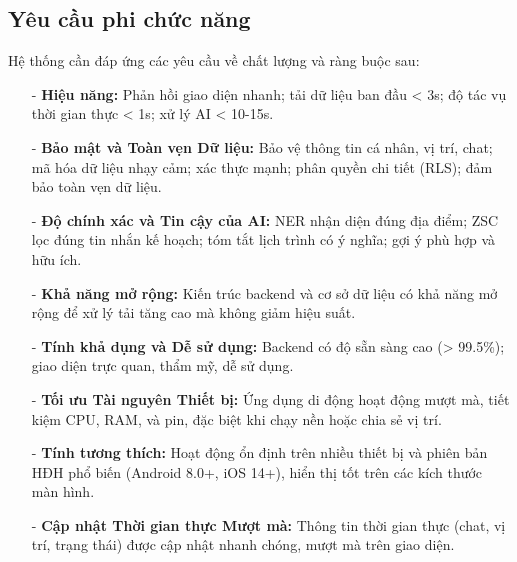 \subsection{Yêu cầu phi chức năng}

Hệ thống cần đáp ứng các yêu cầu về chất lượng và ràng buộc sau:

\begin{itemize}
    \item[-] \textbf{Hiệu năng:} Phản hồi giao diện nhanh; tải dữ liệu ban đầu < 3s; độ tác vụ thời gian thực < 1s; xử lý AI < 10-15s.
    \item[-] \textbf{Bảo mật và Toàn vẹn Dữ liệu:} Bảo vệ thông tin cá nhân, vị trí, chat; mã hóa dữ liệu nhạy cảm; xác thực mạnh; phân quyền chi tiết (RLS); đảm bảo toàn vẹn dữ liệu.
    \item[-] \textbf{Độ chính xác và Tin cậy của AI:} NER nhận diện đúng địa điểm; ZSC lọc đúng tin nhắn kế hoạch; tóm tắt lịch trình có ý nghĩa; gợi ý phù hợp và hữu ích.
    \item[-] \textbf{Khả năng mở rộng:} Kiến trúc backend và cơ sở dữ liệu có khả năng mở rộng để xử lý tải tăng cao mà không giảm hiệu suất.
    \item[-] \textbf{Tính khả dụng và Dễ sử dụng:} Backend có độ sẵn sàng cao (> 99.5\%); giao diện trực quan, thẩm mỹ, dễ sử dụng.
    \item[-] \textbf{Tối ưu Tài nguyên Thiết bị:} Ứng dụng di động hoạt động mượt mà, tiết kiệm CPU, RAM, và pin, đặc biệt khi chạy nền hoặc chia sẻ vị trí.
    \item[-] \textbf{Tính tương thích:} Hoạt động ổn định trên nhiều thiết bị và phiên bản HĐH phổ biến (Android 8.0+, iOS 14+), hiển thị tốt trên các kích thước màn hình.
    \item[-] \textbf{Cập nhật Thời gian thực Mượt mà:} Thông tin thời gian thực (chat, vị trí, trạng thái) được cập nhật nhanh chóng, mượt mà trên giao diện.
\end{itemize}